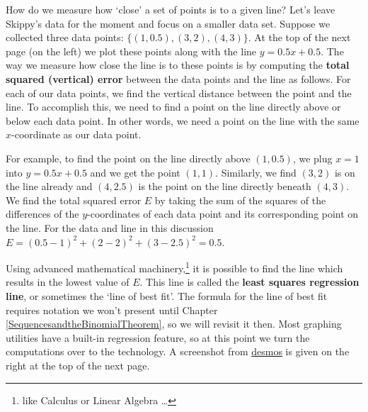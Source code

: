 \documentclass{ximera}
\begin{document}
How do we measure how `close' a set of points is to a given line?   Let's leave Skippy's data for the moment and focus on a smaller data set.  Suppose we collected three data points: $\{(1, 0.5), (3, 2), (4, 3)\}$.  At the top of the next page (on the left) we plot these points along with the line $y = 0.5 x + 0.5$.   The way we measure how close the line is to these points is by computing the \textbf{total squared (vertical) error} between the data points and the line as follows.   For each of our data points, we find the vertical distance between the point and the line.  To accomplish this, we need to find a point on the line directly above or below each data point.  In other words, we need a point on the line with the same $x$-coordinate as our data point.  



For example, to find the point on the line directly above $(1,0.5)$, we plug $x=1$ into $y=0.5x + 0.5$ and we get the point $(1,1)$.  Similarly, we find $(3,2)$ is on the line already and $(4,2.5)$ is the point on the line directly beneath $(4,3)$.   We find the total squared error $E$ by taking the sum of the squares of the differences of the $y$-coordinates of each data point and its corresponding point on the line. For the data and line in this discussion $E = (0.5-1)^2+(2-2)^2+\left(3-2.5\right)^2 = 0.5$.  



Using advanced mathematical machinery,\footnote{like Calculus or Linear Algebra \ldots} it is possible to find the line which results in the lowest value of $E$.  This line is called the \textbf{least squares regression line}, or sometimes the `line of best fit'.  The formula for the line of best fit requires notation we won't present until Chapter \ref{SequencesandtheBinomialTheorem}, so we will revisit it then.  Most graphing utilities have a built-in regression feature, so at this point we turn the computations over to the technology.  A screenshot from \href{www.desmos.com}{\underline{desmos}} is given on the right at the top of the next page.  





\end{document}

